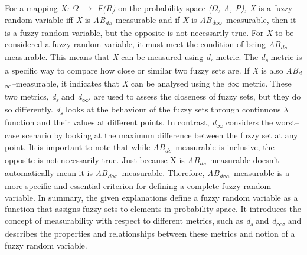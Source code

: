 \documentclass[12pt,a4paper]{report}
\numberwithin{equation}{section}
\begin{document}
For a mapping \emph{X: $\Omega$ $\rightarrow$ F(R)} on the probability space \emph{($\Omega$, A,
P), X} is a fuzzy random variable iff \emph{X} is
\emph{A\textbar B\textsubscript{ds}}--measurable and if \emph{X} is
\emph{A\textbar B\textsubscript{d$\infty$}}--measurable, then it is a fuzzy
random variable, but the opposite is not necessarily true. For \emph{X}
to be considered a fuzzy random variable, it must meet the condition of
being \emph{A\textbar B\textsubscript{ds}}--measurable. This means that
\emph{X} can be measured using \emph{d\textsubscript{s}} metric. The
\emph{d\textsubscript{s}} metric is a specific way to compare how close
or similar two fuzzy sets are. If \emph{X} is also
\emph{A\textbar B\textsubscript{d$\infty$}--}measurable, it indicates that
\emph{X} can be analysed using the \emph{d$\infty$} metric. These two metrics,
\emph{d\textsubscript{s}} and \emph{d\textsubscript{$\infty$}}, are used to
assess the closeness of fuzzy sets, but they do so differently.
\emph{d\textsubscript{s}} looks at the behaviour of the fuzzy sets
through continuous $\lambda$ function and their values at different points. In
contrast, \emph{d\textsubscript{$\infty$}} considers the worst--case scenario by
looking at the maximum difference between the fuzzy set at any point. It
is important to note that while
\emph{A\textbar B\textsubscript{ds}--}measurable is inclusive, the
opposite is not necessarily true. Just because X is
\emph{A\textbar B\textsubscript{ds}}--measurable doesn't automatically
mean it is \emph{A\textbar B\textsubscript{d$\infty$}}--measurable. Therefore,
\emph{A\textbar B\textsubscript{d$\infty$}}--measurable is a more specific
and essential criterion for defining a complete fuzzy random variable.
In summary, the given explanations define a fuzzy random variable as a
function that assigns fuzzy sets to elements in probability space. It
introduces the concept of measurability with respect to different
metrics, such as \emph{d\textsubscript{s}} and
\emph{d\textsubscript{$\infty$}}, and describes the properties and
relationships between these metrics and notion of a fuzzy random
variable.
\end{document}
